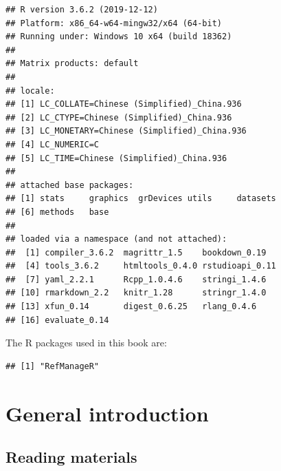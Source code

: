 \documentclass[
]{book}
\begin{document}
\begin{verbatim}
## R version 3.6.2 (2019-12-12)
## Platform: x86_64-w64-mingw32/x64 (64-bit)
## Running under: Windows 10 x64 (build 18362)
## 
## Matrix products: default
## 
## locale:
## [1] LC_COLLATE=Chinese (Simplified)_China.936 
## [2] LC_CTYPE=Chinese (Simplified)_China.936   
## [3] LC_MONETARY=Chinese (Simplified)_China.936
## [4] LC_NUMERIC=C                              
## [5] LC_TIME=Chinese (Simplified)_China.936    
## 
## attached base packages:
## [1] stats     graphics  grDevices utils     datasets 
## [6] methods   base     
## 
## loaded via a namespace (and not attached):
##  [1] compiler_3.6.2  magrittr_1.5    bookdown_0.19  
##  [4] tools_3.6.2     htmltools_0.4.0 rstudioapi_0.11
##  [7] yaml_2.2.1      Rcpp_1.0.4.6    stringi_1.4.6  
## [10] rmarkdown_2.2   knitr_1.28      stringr_1.4.0  
## [13] xfun_0.14       digest_0.6.25   rlang_0.4.6    
## [16] evaluate_0.14
\end{verbatim}

The R packages used in this book are:

\begin{verbatim}
## [1] "RefManageR"
\end{verbatim}

\mainmatter

\hypertarget{general-introduction}{%
\chapter{General introduction}\label{general-introduction}}

\hypertarget{reading-materials}{%
\section{Reading materials}\label{reading-materials}}
\end{document}
